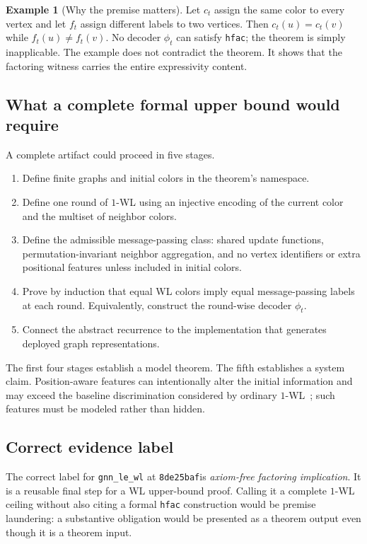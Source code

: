 \documentclass[10pt,letterpaper]{article}
\theoremstyle{definition}
\newtheorem{example}[theorem]{Example}
\newcommand{\shortcommit}{\texttt{8de25baf}}
\begin{document}
\begin{example}[Why the premise matters]
Let \(c_t\) assign the same color to every vertex and let \(f_t\) assign
different labels to two vertices. Then \(c_t(u)=c_t(v)\) while
\(f_t(u)\neq f_t(v)\). No decoder \(\phi_t\) can satisfy \texttt{hfac}; the
theorem is simply inapplicable. The example does not contradict the theorem.
It shows that the factoring witness carries the entire expressivity content.
\end{example}

\subsection{What a complete formal upper bound would require}
A complete artifact could proceed in five stages.
\begin{enumerate}
\item Define finite graphs and initial colors in the theorem's namespace.
\item Define one round of \(1\)-WL using an injective encoding of the current
  color and the multiset of neighbor colors.
\item Define the admissible message-passing class: shared update functions,
  permutation-invariant neighbor aggregation, and no vertex identifiers or
  extra positional features unless included in initial colors.
\item Prove by induction that equal WL colors imply equal message-passing
  labels at each round. Equivalently, construct the round-wise decoder
  \(\phi_t\).
\item Connect the abstract recurrence to the implementation that generates
  deployed graph representations.
\end{enumerate}
The first four stages establish a model theorem. The fifth establishes a system
claim. Position-aware features can intentionally alter the initial information
and may exceed the baseline discrimination considered by ordinary
\(1\)-WL~\cite{you2019pgnn}; such features must be modeled rather than hidden.

\subsection{Correct evidence label}
The correct label for \texttt{gnn\_le\_wl} at \shortcommit is
\emph{axiom-free factoring implication}. It is a reusable final step for a WL
upper-bound proof. Calling it a complete \(1\)-WL ceiling without also citing a
formal \texttt{hfac} construction would be premise laundering: a substantive
obligation would be presented as a theorem output even though it is a theorem
input.
\end{document}

